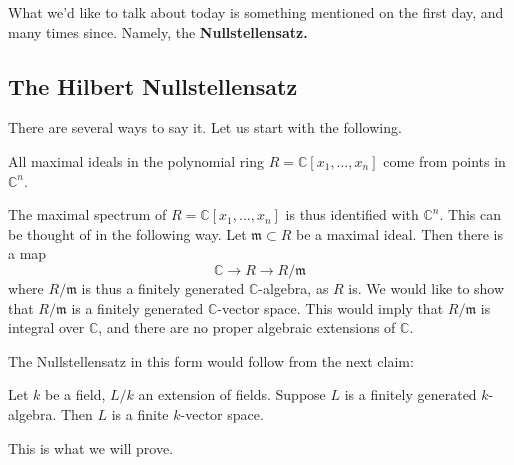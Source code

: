 
What we'd like to talk about today is something mentioned on the first day, and
many times since. Namely, the \textbf{Nullstellensatz.}

\subsection{The Hilbert Nullstellensatz}

There are several ways to say it. Let us start with the following. 

\begin{theorem} 
All maximal ideals in the polynomial ring $R=\mathbb{C}[x_1, \dots, x_n]$ come
from points in $\mathbb{C}^n$. 
\end{theorem} 
The maximal spectrum of $R=\mathbb{C}[x_1, \dots, x_n]$ is thus identified with
$\mathbb{C}^n$. This can be thought of in the following way. Let
$\mathfrak{m}\subset R$ be a maximal ideal. Then there is a map
\[ \mathbb{C} \to R \to R/\mathfrak{m}  \]
where $R/\mathfrak{m}$ is thus a finitely generated $\mathbb{C}$-algebra, as
$R$ is. 
We would like to show that $R/\mathfrak{m}$ is a finitely generated $\mathbb{C}$-vector
space. This would imply that $R/\mathfrak{m}$ is integral over $\mathbb{C}$,
and there are no proper algebraic extensions of $\mathbb{C}$.

The Nullstellensatz in this form would follow from the next claim:

\begin{proposition} 
Let $k$ be a field, $L/k$ an extension of fields. Suppose $L$ is a finitely
generated $k$-algebra. Then $L$	is a finite $k$-vector space.
\end{proposition} 
This is what we will prove.

